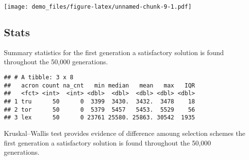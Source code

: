 \documentclass[]{book}
\newenvironment{Shaded}{\begin{snugshade}}{\end{snugshade}}
\newcommand{\DataTypeTok}[1]{\textcolor[rgb]{0.13,0.29,0.53}{#1}}
\newcommand{\KeywordTok}[1]{\textcolor[rgb]{0.13,0.29,0.53}{\textbf{#1}}}
\newcommand{\NormalTok}[1]{#1}
\newcommand{\OperatorTok}[1]{\textcolor[rgb]{0.81,0.36,0.00}{\textbf{#1}}}
\newcommand{\OtherTok}[1]{\textcolor[rgb]{0.56,0.35,0.01}{#1}}
\newcommand{\StringTok}[1]{\textcolor[rgb]{0.31,0.60,0.02}{#1}}
\begin{document}
\texttt{[image: demo\_files/figure-latex/unnamed-chunk-9-1.pdf]}

\hypertarget{stats-1}{%
\subsection{Stats}\label{stats-1}}

Summary statistics for the first generation a satisfactory solution is found throughout the 50,000 generations.

\begin{Shaded}
\end{Shaded}

\begin{verbatim}
## # A tibble: 3 x 8
##   acron count na_cnt   min median   mean   max   IQR
##   <fct> <int>  <int> <dbl>  <dbl>  <dbl> <dbl> <dbl>
## 1 tru      50      0  3399  3430.  3432.  3478    18
## 2 tor      50      0  5379  5457   5453.  5529    56
## 3 lex      50      0 23761 25580. 25863. 30542  1935
\end{verbatim}

Kruskal--Wallis test provides evidence of difference amoung selection schemes the first generation a satisfactory solution is found throughout the 50,000 generations.
\end{document}
